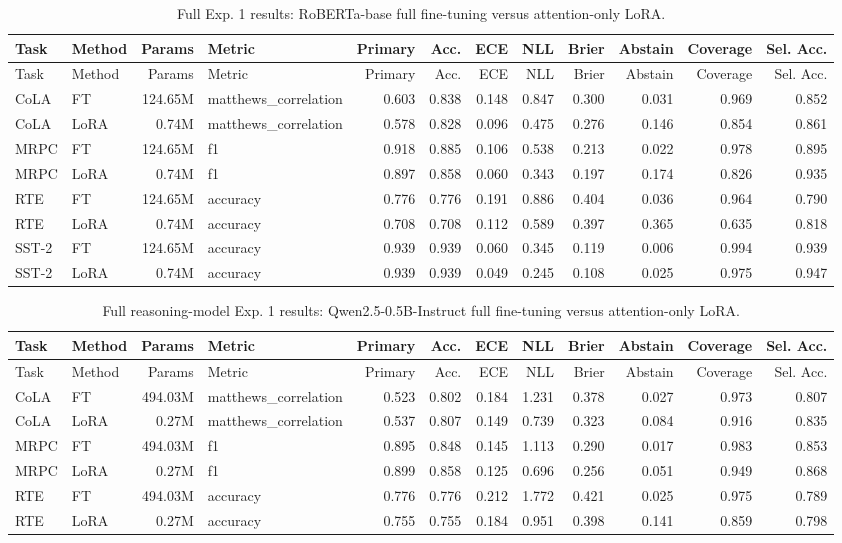 {\scriptsize
\begin{longtable}{llrlrrrrrrrr}
\caption{Full Exp. 1 results: RoBERTa-base full fine-tuning versus attention-only LoRA.}
\label{tab:exp1-full}\\
\toprule
Task & Method & Params & Metric & Primary & Acc. & ECE & NLL & Brier & Abstain & Coverage & Sel. Acc. \\
\midrule
\endfirsthead
\toprule
Task & Method & Params & Metric & Primary & Acc. & ECE & NLL & Brier & Abstain & Coverage & Sel. Acc. \\
\midrule
\endhead
CoLA & FT & 124.65M & matthews\_correlation & 0.603 & 0.838 & 0.148 & 0.847 & 0.300 & 0.031 & 0.969 & 0.852 \\
CoLA & LoRA & 0.74M & matthews\_correlation & 0.578 & 0.828 & 0.096 & 0.475 & 0.276 & 0.146 & 0.854 & 0.861 \\
MRPC & FT & 124.65M & f1 & 0.918 & 0.885 & 0.106 & 0.538 & 0.213 & 0.022 & 0.978 & 0.895 \\
MRPC & LoRA & 0.74M & f1 & 0.897 & 0.858 & 0.060 & 0.343 & 0.197 & 0.174 & 0.826 & 0.935 \\
RTE & FT & 124.65M & accuracy & 0.776 & 0.776 & 0.191 & 0.886 & 0.404 & 0.036 & 0.964 & 0.790 \\
RTE & LoRA & 0.74M & accuracy & 0.708 & 0.708 & 0.112 & 0.589 & 0.397 & 0.365 & 0.635 & 0.818 \\
SST-2 & FT & 124.65M & accuracy & 0.939 & 0.939 & 0.060 & 0.345 & 0.119 & 0.006 & 0.994 & 0.939 \\
SST-2 & LoRA & 0.74M & accuracy & 0.939 & 0.939 & 0.049 & 0.245 & 0.108 & 0.025 & 0.975 & 0.947 \\
\bottomrule
\end{longtable}
}

{\scriptsize
\begin{longtable}{llrlrrrrrrrr}
\caption{Full reasoning-model Exp. 1 results: Qwen2.5-0.5B-Instruct full fine-tuning versus attention-only LoRA.}
\label{tab:exp1-reasoning-full}\\
\toprule
Task & Method & Params & Metric & Primary & Acc. & ECE & NLL & Brier & Abstain & Coverage & Sel. Acc. \\
\midrule
\endfirsthead
\toprule
Task & Method & Params & Metric & Primary & Acc. & ECE & NLL & Brier & Abstain & Coverage & Sel. Acc. \\
\midrule
\endhead
CoLA & FT & 494.03M & matthews\_correlation & 0.523 & 0.802 & 0.184 & 1.231 & 0.378 & 0.027 & 0.973 & 0.807 \\
CoLA & LoRA & 0.27M & matthews\_correlation & 0.537 & 0.807 & 0.149 & 0.739 & 0.323 & 0.084 & 0.916 & 0.835 \\
MRPC & FT & 494.03M & f1 & 0.895 & 0.848 & 0.145 & 1.113 & 0.290 & 0.017 & 0.983 & 0.853 \\
MRPC & LoRA & 0.27M & f1 & 0.899 & 0.858 & 0.125 & 0.696 & 0.256 & 0.051 & 0.949 & 0.868 \\
RTE & FT & 494.03M & accuracy & 0.776 & 0.776 & 0.212 & 1.772 & 0.421 & 0.025 & 0.975 & 0.789 \\
RTE & LoRA & 0.27M & accuracy & 0.755 & 0.755 & 0.184 & 0.951 & 0.398 & 0.141 & 0.859 & 0.798 \\
\bottomrule
\end{longtable}
}

